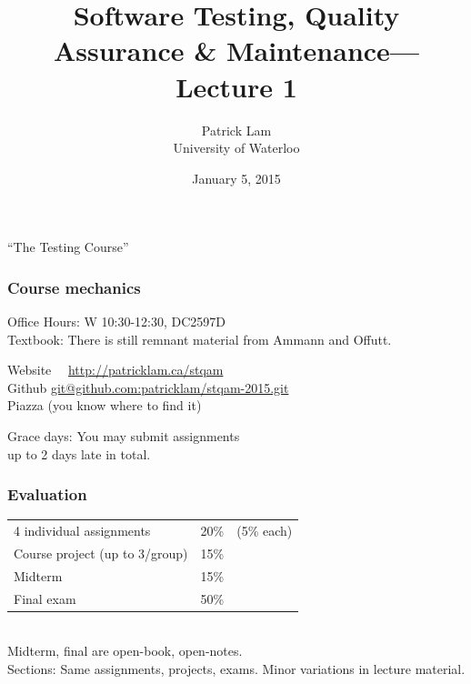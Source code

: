 \documentclass{beamer}
\title{Software Testing, Quality Assurance \& Maintenance---Lecture 1}
\author{Patrick Lam\\University of Waterloo}
\date{January 5, 2015}
\newenvironment{changemargin}[1]{%
  \begin{list}{}{%
    \setlength{\topsep}{0pt}%
    \setlength{\leftmargin}{#1}%
    \setlength{\rightmargin}{1em}
    \setlength{\listparindent}{\parindent}%
    \setlength{\itemindent}{\parindent}%
    \setlength{\parsep}{\parskip}%
  }%
  \item[]}{\end{list}}
\begin{document}
\begin{frame}
  \titlepage
\end{frame}

\begin{frame}
  \begin{center}
  \Huge ``The Testing Course''
  \end{center}
\end{frame}

\begin{frame}
\frametitle{Course mechanics}

\Large

\begin{changemargin}{1em}
  Office Hours: W 10:30-12:30, DC2597D\\[1em]
  
  Textbook: There is still remnant material from Ammann and
Offutt.\\[1em]

{\small
  \begin{tabbing}
Website~~ \= \url{http://patricklam.ca/stqam}\\[1em]
Github \> \url{git@github.com:patricklam/stqam-2015.git}\\[1em]
Piazza \> (you know where to find it)
  \end{tabbing}
}

  Grace days: You may submit assignments \\ up to 2 days late in total.
\end{changemargin}

\end{frame}

\begin{frame}
  \frametitle{Evaluation}
  \Large
\begin{changemargin}{2em}
\begin{tabular}{lrl}
4 individual assignments & 20\% & (5\% each) \\
Course project (up to 3/group) & 15\% \\
Midterm & 15\% \\
Final exam & 50\% \\
\end{tabular}~\\[1em]

Midterm, final are open-book, open-notes.\\[1em]

Sections: Same assignments, projects, exams. Minor variations in lecture material.

\end{changemargin}

\end{frame}
\end{document}
